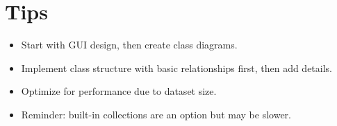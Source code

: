 \documentclass{article}
\begin{document}
\section*{Tips}
\begin{itemize}
    \item Start with GUI design, then create class diagrams.
    \item Implement class structure with basic relationships first, then add details.
    \item Optimize for performance due to dataset size.
    \item Reminder: built-in collections are an option but may be slower.
\end{itemize}
\end{document}
